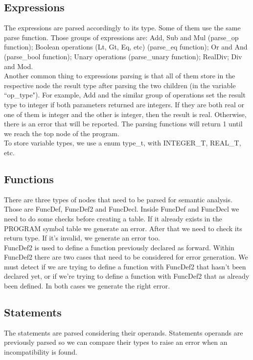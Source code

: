 \documentclass[12pt]{article}
\begin{document}
\subsection{Expressions}

The expressions are parsed accordingly to its type. Some of them use the same parse function. Those groups of expressions are: Add, Sub and Mul (parse\_op function); Boolean operations (Lt, Gt, Eq, etc) (parse\_eq function); Or and And (parse\_bool function); Unary operations (parse\_unary function); RealDiv; Div and Mod.\\
Another common thing to expressions parsing is that all of them store in the respective node the result type after parsing the two children (in the variable ``op\_type"). For example, Add and the similar group of operations set the result type to integer if both parameters returned are integers. If they are both real or one of them is integer and the other is integer, then the result is real. Otherwise, there is an error that will be reported. The parsing functions will return 1 until we reach the top node of the program.\\
To store variable types, we use a enum type\_t, with INTEGER\_T, REAL\_T, etc.\\

\subsection{Functions}
There are three types of nodes that need to be parsed for semantic analysis. Those are FuncDef, FuncDef2 and FuncDecl. Inside FuncDef and FuncDecl we need to do some checks before creating a table. If it already exists in the PROGRAM symbol table we generate an error. After that we need to check its return type. If it's invalid, we generate an error too. \\
FuncDef2 is used to define a function previously declared as forward. Within FuncDef2 there are two cases that need to be considered for error generation. We must detect if we are trying to define a function with FuncDef2 that hasn't been declared yet, or if we're trying to define a function with FuncDef2 that as already been defined. In both cases we generate the right error. \\

\subsection{Statements}
The statements are parsed considering their operands. Statements operands are previously parsed so we can compare their types to raise an error when an incompatibility is found.\\
\end{document}
